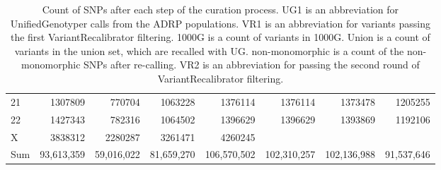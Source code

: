 \begin{table}[htbp]
{\begin{tabular}{l|r|r|r|r|r|r|r}
21 & 1307809 & 770704 & 1063228 & 1376114 & 1376114 & 1373478 & 1205255 \\
22 & 1427343 & 782316 & 1064502 & 1396629 & 1396629 & 1393869 & 1192106 \\
X & 3838312 & 2280287 & 3261471 & 4260245 &  &  &  \\
\hline
Sum & 93,613,359 & 59,016,022 & 81,659,270 & 106,570,502 & 102,310,257 & 102,136,988 & 91,537,646 \\
\hline
\end{tabular}
}
\caption[\gls{SNP} count after each \gls{ADRP} data curation step.]{Count of SNPs after each step of the curation process. UG1 is an abbreviation for UnifiedGenotyper calls from the ADRP populations. VR1 is an abbreviation for variants passing the first VariantRecalibrator filtering. 1000G is a count of variants in 1000G. Union is a count of variants in the union set, which are recalled with UG. non-monomorphic is a count of the non-monomorphic SNPs after re-calling. VR2 is an abbreviation for passing the second round of VariantRecalibrator filtering.}
\label{tab:SNPcount}
\end{table}